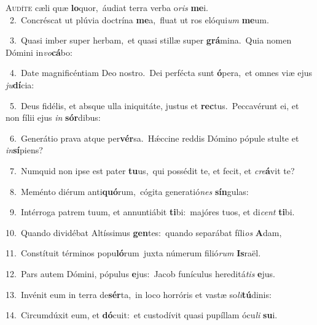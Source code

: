 \lettrine{\initial\textcolor{\initialcolor}{A}}{udíte} cæli quæ \textbf{lo}\-quor,~\star áudiat terra verba o\textit{ris} \textbf{me}\-i.\\
{\numbfont\textcolor{\numbcolor}{~2.}}~Concréscat ut plúvia doctrína \textbf{me}\-a,~\star fluat ut ros elóqui\textit{um} \textbf{me}\-um.\par
{\numbfont\textcolor{\numbcolor}{~3.}}~Quasi imber super herbam,~\dagger et quasi stillæ super \textbf{grá}\-mina.~\star Quia nomen Dómini in\-\textit{vo}\-\textbf{cá}bo:\par
{\numbfont\textcolor{\numbcolor}{~4.}}~Date magnificéntiam Deo nostro.~\dagger Dei perfécta sunt \textbf{ó}\-pera,~\star et omnes viæ ejus \textit{ju}\-\textbf{dí}cia:\par
{\numbfont\textcolor{\numbcolor}{~5.}}~Deus fidélis, et absque ulla iniquitáte, justus et \textbf{rec}\-tus.~\star Peccavérunt ei, et non fílii ejus \textit{in} \textbf{sór}\-dibus:\par
{\numbfont\textcolor{\numbcolor}{~6.}}~Generátio prava atque per\-\textbf{vér}\-sa.~\star Hǽccine reddis Dómino pópule stulte et \textit{in}\-\textbf{sí}piens?\par
{\numbfont\textcolor{\numbcolor}{~7.}}~Numquid non ipse est pater \textbf{tu}\-us,~\star qui possédit te, et fecit, et \textit{cre}\-\textbf{á}vit te?\par
{\numbfont\textcolor{\numbcolor}{~8.}}~Meménto diérum anti\-\textbf{quó}\-rum,~\star cógita generatió\textit{nes} \textbf{sín}\-gulas:\par
{\numbfont\textcolor{\numbcolor}{~9.}}~Intérroga patrem tuum, et annuntiábit \textbf{ti}\-bi:~\star majóres tuos, et di\textit{cent} \textbf{ti}\-bi.\par
{\numbfont\textcolor{\numbcolor}{10.}}~Quando dividébat Altíssimus \textbf{gen}\-tes:~\star quando separábat fíli\textit{os} \textbf{A}\-dam,\par
{\numbfont\textcolor{\numbcolor}{11.}}~Constítuit términos popu\-\textbf{ló}\-rum~\star juxta númerum filió\textit{rum} \textbf{Is}\-raël.\par
{\numbfont\textcolor{\numbcolor}{12.}}~Pars autem Dómini, pópulus \textbf{e}\-jus:~\star Jacob funículus hereditá\textit{tis} \textbf{e}\-jus.\par
{\numbfont\textcolor{\numbcolor}{13.}}~Invénit eum in terra de\-\textbf{sér}\-ta,~\star in loco horróris et vastæ so\-\textit{li}\-\textbf{tú}dinis:\par
{\numbfont\textcolor{\numbcolor}{14.}}~Circumdúxit eum, et \textbf{dó}\-cuit:~\star et custodívit quasi pupíllam ócu\textit{li} \textbf{su}\-i.\par
